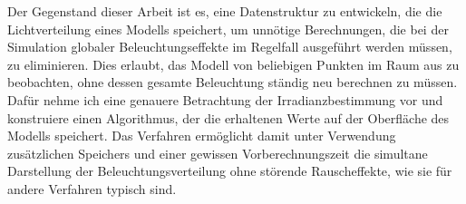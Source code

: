 Der Gegenstand dieser Arbeit ist es, eine Datenstruktur zu entwickeln, die die Lichtverteilung eines Modells speichert, um unnötige Berechnungen, die bei der Simulation globaler Beleuchtungseffekte im Regelfall ausgeführt werden müssen, zu eliminieren.
Dies erlaubt, das Modell von beliebigen Punkten im Raum aus zu beobachten, ohne dessen gesamte Beleuchtung ständig neu berechnen zu müssen.
Dafür nehme ich eine genauere Betrachtung der Irradianzbestimmung vor und konstruiere einen Algorithmus, der die erhaltenen Werte auf der Oberfläche des Modells speichert.
Das Verfahren ermöglicht damit unter Verwendung zusätzlichen Speichers und einer gewissen Vorberechnungszeit die simultane Darstellung der Beleuchtungsverteilung ohne störende Rauscheffekte, wie sie für andere Verfahren typisch sind.
